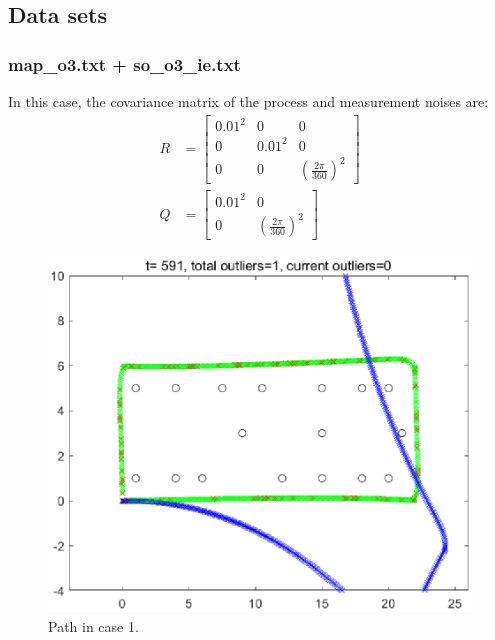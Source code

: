 \documentclass[11pt,a4paper]{article}
\begin{document}
\newpage
\subsection{Data sets}
\subsubsection{map\_o3.txt + so\_o3\_ie.txt}
\par In this case, the covariance matrix of the process and measurement noises are:
\begin{align*}
	R &= \begin{bmatrix} 0 .01^{2} & 0 & 0 \\ 0 & 0.01^{2} & 0 \\ 0 & 0 & (\frac{2\pi}{360})^{2} \end{bmatrix} \\
	Q &= \begin{bmatrix} 0.01^{2} & 0 \\ 0 & (\frac{2\pi}{360})^{2} \end{bmatrix}
\end{align*}
\vspace{2cm}
\begin{figure}[H]
	\centering
	\includegraphics[width=\columnwidth]{Figure/Case_1_Figure_1.eps}
	\caption{Path in case 1.}
	\label{fig:Case_1_Figure_1}
\end{figure}
\end{document}

